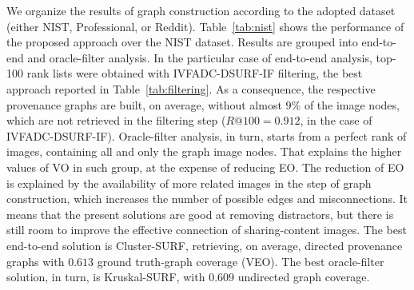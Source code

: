 We organize the results of graph construction according to the adopted dataset (either NIST, Professional, or Reddit).
Table~\ref{tab:nist} shows the performance of the proposed approach over the NIST dataset.
Results are grouped into end-to-end and oracle-filter analysis.
In the particular case of end-to-end analysis, top-100 rank lists were obtained with IVFADC-DSURF-IF filtering, the best approach reported in Table~\ref{tab:filtering}.
As a consequence, the respective provenance graphs are built, on average, without almost $9\%$ of the image nodes, which are not retrieved in the filtering step ($R@100 = 0.912$, in the case of IVFADC-DSURF-IF).
Oracle-filter analysis, in turn, starts from a perfect rank of images, containing all and only the graph image nodes.
That explains the higher values of VO in such group, at the expense of reducing EO.
The reduction of EO is explained by the availability of more related images in the step of graph construction, which increases the number of possible edges and misconnections.
It means that the present solutions are good at removing distractors, but there is still room to improve the effective connection of sharing-content images.
The best end-to-end solution is Cluster-SURF, retrieving, on average, directed provenance graphs with $0.613$ ground truth-graph coverage (VEO).
The best oracle-filter solution, in turn, is Kruskal-SURF, with $0.609$ undirected graph coverage.

